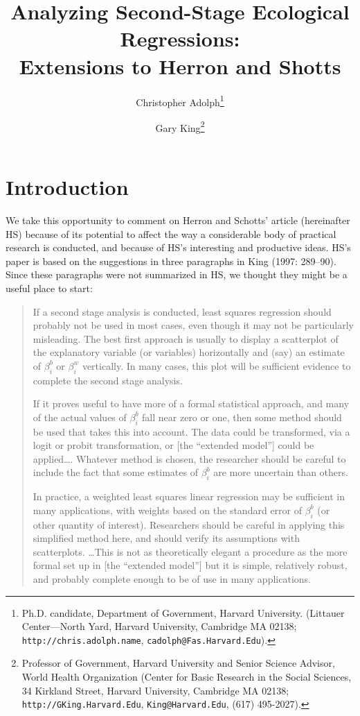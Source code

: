 \documentclass[11pt,titlepage]{article}
\title{Analyzing Second-Stage Ecological Regressions:\\
  Extensions to Herron and Shotts}
\author{Christopher Adolph\thanks{Ph.D. candidate, Department of
    Government, Harvard University. (Littauer Center---North Yard,
    Harvard University, Cambridge MA 02138;
    \texttt{http://chris.adolph.name},
    \texttt{cadolph@Fas.Harvard.Edu}).}
\and %
Gary King\thanks{Professor of Government, Harvard University and
  Senior Science Advisor, World Health Organization (Center for Basic
  Research in the Social Sciences, 34 Kirkland Street, Harvard
  University, Cambridge MA 02138; \texttt{http://GKing.Harvard.Edu},
  \texttt{King@Harvard.Edu}, (617) 495-2027).}  }
\begin{document}
\maketitle

\section{Introduction}

We take this opportunity to comment on Herron and Schotts' article
(hereinafter HS) because of its potential to affect the way a
considerable body of practical research is conducted, and because of
HS's interesting and productive ideas.  HS's paper is based on the
suggestions in three paragraphs in King (1997: 289--90).  Since these
paragraphs were not summarized in HS, we thought they might be a
useful place to start:
\begin{quotation}
  If a second stage analysis is conducted, least squares regression
  should probably not be used in most cases, even though it may not be
  particularly misleading.  The best first approach is usually to
  display a scatterplot of the explanatory variable (or variables)
  horizontally and (say) an estimate of $\beta_i^b$ or $\beta_i^w$
  vertically.  In many cases, this plot will be sufficient evidence to
  complete the second stage analysis.
  
  If it proves useful to have more of a formal statistical approach,
  and many of the actual values of $\beta_i^b$ fall near zero or one,
  then some method should be used that takes this into account.  The
  data could be transformed, via a logit or probit transformation, or
  [the ``extended model''] could be applied\ldots.  Whatever method is
  chosen, the researcher should be careful to include the fact that
  some estimates of $\beta_i^b$ are more uncertain than others.
    
  In practice, a weighted least squares linear regression may be
  sufficient in many applications, with weights based on the standard
  error of $\beta_i^b$ (or other quantity of interest).  Researchers
  should be careful in applying this simplified method here, and
  should verify its assumptions with scatterplots. \ldots This is not
  as theoretically elegant a procedure as the more formal set up in
  [the ``extended model''] but it is simple, relatively robust, and
  probably complete enough to be of use in many applications.
\end{quotation}  
\end{document}
